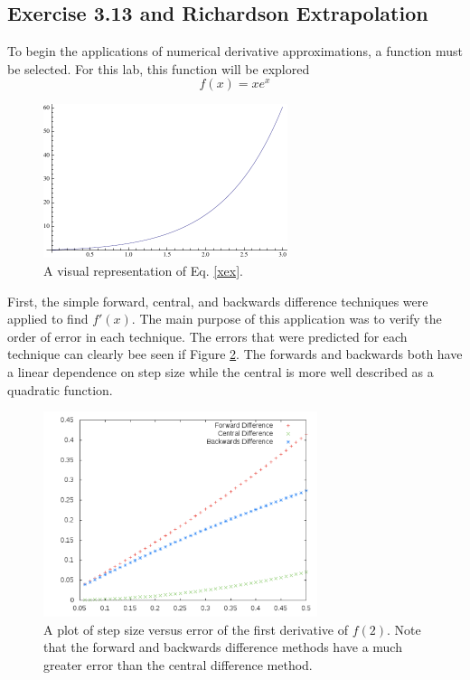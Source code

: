 \documentclass[12pt]{article}
\begin{document}
\subsection{Exercise 3.13 and Richardson Extrapolation}
To begin the applications of numerical derivative approximations, a function must be selected.  For this lab, this function will be explored
\begin{equation}
\label{xex}
f(x)=x e^x
\end{equation}
\begin{figure}[!h]
\centering
\includegraphics[width =100 mm, height = 45mm]{Ex_3_13.pdf}
\caption{A visual representation of Eq. \eqref{xex}.}
\label{fig:3.13}
\end{figure}
First, the simple forward, central, and backwards difference techniques were applied to find $f'(x)$.  The main purpose of this application was to verify the order of error in each technique.  The errors that were predicted for each technique can clearly bee seen if Figure \ref{fig:3.13.1st}.  The forwards and backwards both have a linear dependence on step size while the central is more well described as a quadratic function.
\begin{figure}[!h]
\centering
\includegraphics[width =120 mm, height = 60mm]{Ex_3_13_1st.pdf}
\caption{A plot of step size versus error of the first derivative of $f(2)$.  Note that the forward and backwards difference methods have a much greater error than the central difference method.}
\label{fig:3.13.1st}
\end{figure}
\end{document}
